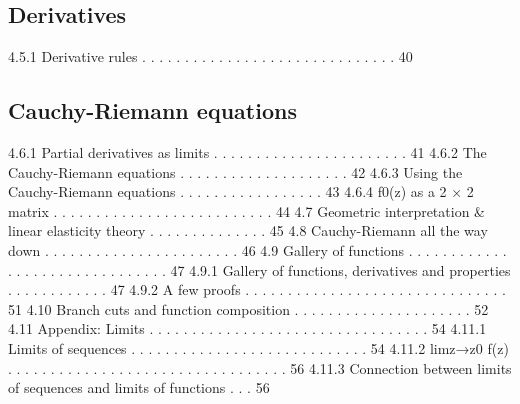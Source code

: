 \subsection{Derivatives}
4.5.1 Derivative rules . . . . . . . . . . . . . . . . . . . . . . . . . . . . . . 40
\subsection{Cauchy-Riemann equations}
4.6.1 Partial derivatives as limits . . . . . . . . . . . . . . . . . . . . . . . 41
4.6.2 The Cauchy-Riemann equations . . . . . . . . . . . . . . . . . . . . 42
4.6.3 Using the Cauchy-Riemann equations . . . . . . . . . . . . . . . . . 43
4.6.4 f0(z) as a 2 × 2 matrix . . . . . . . . . . . . . . . . . . . . . . . . . . 44
4.7 Geometric interpretation \& linear elasticity theory . . . . . . . . . . . . . . 45
4.8 Cauchy-Riemann all the way down . . . . . . . . . . . . . . . . . . . . . . . 46
4.9 Gallery of functions . . . . . . . . . . . . . . . . . . . . . . . . . . . . . . . 47
4.9.1 Gallery of functions, derivatives and properties . . . . . . . . . . . . 47
4.9.2 A few proofs . . . . . . . . . . . . . . . . . . . . . . . . . . . . . . . 51
4.10 Branch cuts and function composition . . . . . . . . . . . . . . . . . . . . . 52
4.11 Appendix: Limits . . . . . . . . . . . . . . . . . . . . . . . . . . . . . . . . . 54
4.11.1 Limits of sequences . . . . . . . . . . . . . . . . . . . . . . . . . . . . 54
4.11.2 limz→z0
f(z) . . . . . . . . . . . . . . . . . . . . . . . . . . . . . . . . . 56
4.11.3 Connection between limits of sequences and limits of functions . . . 56
